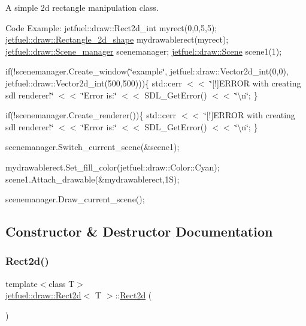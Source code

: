 A simple 2d rectangle manipulation class.

Code Example\+: jetfuel\+::draw\+::\+Rect2d\+\_\+int myrect(0,0,5,5); \hyperlink{classjetfuel_1_1draw_1_1Rectangle__2d__shape}{jetfuel\+::draw\+::\+Rectangle\+\_\+2d\+\_\+shape} mydrawablerect(myrect); \hyperlink{classjetfuel_1_1draw_1_1Scene__manager}{jetfuel\+::draw\+::\+Scene\+\_\+manager} scenemanager; \hyperlink{classjetfuel_1_1draw_1_1Scene}{jetfuel\+::draw\+::\+Scene} scene1(1);

if(!scenemanager.Create\+\_\+window(\char`\"{}example\char`\"{}, jetfuel\+::draw\+::\+Vector2d\+\_\+int(0,0), jetfuel\+::draw\+::\+Vector2d\+\_\+int(500,500)))\{ std\+::cerr $<$$<$ \char`\"{}\mbox{[}!\mbox{]}\+E\+R\+R\+O\+R with creating sdl renderer!\char`\"{} $<$$<$ \char`\"{}\+Error is\+:\char`\"{} $<$$<$ S\+D\+L\+\_\+\+Get\+Error() $<$$<$ \char`\"{}\textbackslash{}n\char`\"{}; \}

if(!scenemanager.Create\+\_\+renderer())\{ std\+::cerr $<$$<$ \char`\"{}\mbox{[}!\mbox{]}\+E\+R\+R\+O\+R with creating sdl renderer!\char`\"{} $<$$<$ \char`\"{}\+Error is\+:\char`\"{} $<$$<$ S\+D\+L\+\_\+\+Get\+Error() $<$$<$ \char`\"{}\textbackslash{}n\char`\"{}; \}

scenemanager.\+Switch\+\_\+current\+\_\+scene(\&scene1);

mydrawablerect.\+Set\+\_\+fill\+\_\+color(jetfuel\+::draw\+::\+Color\+::\+Cyan); scene1.\+Attach\+\_\+drawable(\&mydrawablerect,1\+S);

scenemanager.\+Draw\+\_\+current\+\_\+scene(); 

\subsection{Constructor \& Destructor Documentation}
\mbox{\label{classjetfuel_1_1draw_1_1Rect2d_af5a9c18dea4e196ec326f31ab63ad644}} 
\subsubsection{\texorpdfstring{Rect2d()}{Rect2d()}\hspace{0.1cm}{\footnotesize\ttfamily [1/3]}}
{\footnotesize\ttfamily template$<$class T$>$ \\
\hyperlink{classjetfuel_1_1draw_1_1Rect2d}{jetfuel\+::draw\+::\+Rect2d}$<$ T $>$\+::\hyperlink{classjetfuel_1_1draw_1_1Rect2d}{Rect2d} (\begin{DoxyParamCaption}{ }\end{DoxyParamCaption})\hspace{0.3cm}{\ttfamily [inline]}}



